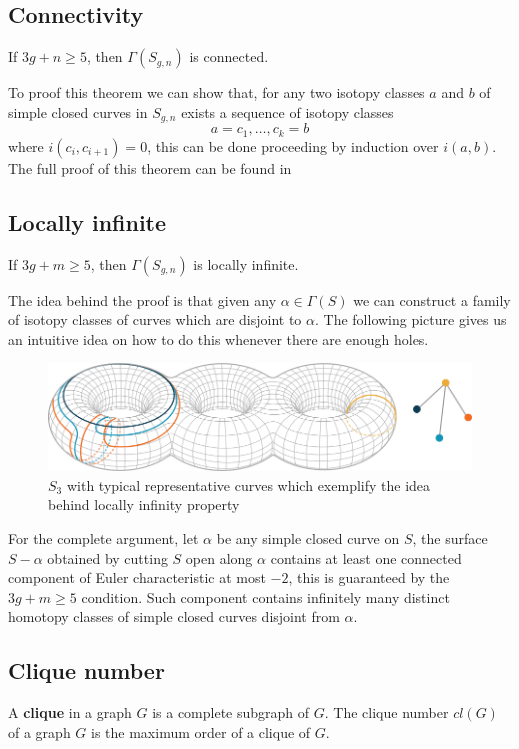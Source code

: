 \subsection{Connectivity}
\begin{theorem}
If $3g+n\geq 5$, then $\Gamma(S_{g,n})$ is connected.
\end{theorem}

To proof this theorem we can show that, for any two isotopy classes $a$ and $b$ of simple closed curves in $S_{g,n}$ exists a sequence of isotopy classes
$$a=c_{1},\dots,c_{k}=b$$
where $i(c_{i},c_{i+1})=0$, this can be done proceeding by induction over $i(a,b)$. The full proof of this theorem can be found in \cite[Farb, p.~93]{Farb} 

\subsection{Locally infinite}
\begin{theorem}
If $3g+m\geq 5$, then $\Gamma(S_{g,n})$ is locally infinite.
\end{theorem}
The idea behind the proof is that given any $\alpha \in \Gamma(S)$ we can construct a family of isotopy classes of curves which are disjoint to $\alpha$. The following picture gives us an intuitive idea on how to do this whenever there are enough holes.
\vspace{0.5cm}
\begin{figure}[h!]
	\centering
	\includegraphics[scale=0.6]{Figures/Locally-infinite.png}
	\caption{$S_{3}$ with typical representative curves which exemplify the idea behind locally infinity property}
\end{figure}

For the complete argument, let $\alpha$ be any simple closed curve on $S$, the surface $S-\alpha$ obtained by cutting $S$ open along $\alpha$ contains at least one connected component of Euler characteristic at most $-2$, this is guaranteed by the $3g+m\geq 5$ condition. Such component contains infinitely many distinct homotopy classes of simple closed curves disjoint from $\alpha$.

\subsection{Clique number}
A \textbf{clique} in a graph $G$ is a complete subgraph of $G$. The clique number $cl(G)$ of a graph $G$ is the maximum order of a clique of $G$.

